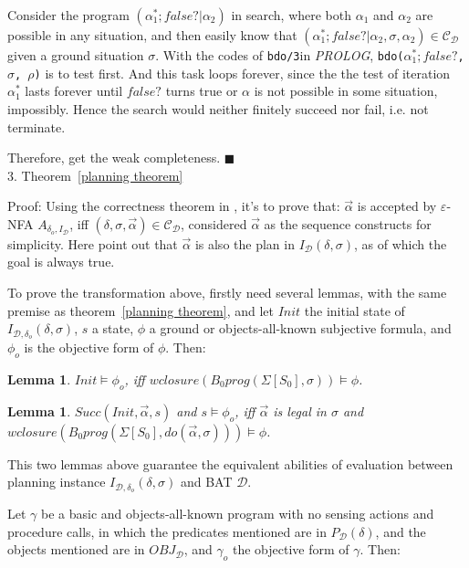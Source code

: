 \documentclass[letterpaper]{article}
\newtheorem{lemma}[theorem]{Lemma}
\begin{document}
Consider the program $(\alpha_1^*;false?|\alpha_2)$ in search, where both $\alpha_1$ and $\alpha_2$ are possible in any situation, and then easily know that $(\alpha_1^*;false?|\alpha_2, \sigma, \alpha_2)\in \mathcal{C_D}$ given a ground situation $\sigma$. With the codes of \texttt{bdo/3}in \emph{PROLOG}, \texttt{bdo($\alpha_1^*;false?$, $\sigma$, $\rho$)} is to test first. And this task loops forever, since the the test of iteration $\alpha_1^*$ lasts forever until $false?$ turns true or $\alpha$ is not possible in some situation, impossibly. Hence the search would neither finitely succeed nor fail, i.e. not terminate.

Therefore, get the weak completeness.
$\blacksquare$
\\

3. Theorem~\ref{planning theorem}

Proof: Using the correctness theorem in \cite{BFM07}, it's to prove that: $\vec{\alpha}$ is accepted by $\varepsilon$-NFA $A_{\delta_o,I_\mathcal{D}}$, iff $(\delta,\sigma,\vec{\alpha})\in\mathcal{C_D}$, considered $\vec{\alpha}$ as the sequence constructs for simplicity. Here point out that $\vec{\alpha}$ is also the plan in $I_\mathcal{D}(\delta,\sigma)$, as of which the goal is always true.

To prove the transformation above, firstly need several lemmas, with the same premise as theorem~\ref{planning theorem}, and let $Init$ the initial state of $I_{\mathcal{D},\delta_o}(\delta,\sigma)$, $s$ a state, $\phi$ a ground or objects-all-known subjective formula, and $\phi_o$ is the objective form of $\phi$. Then:

\begin{lemma}\label{init evaluation}
$Init\models\phi_o$, iff $wclosure(B_0 prog(\Sigma[S_0],\sigma))\models\phi$.
\end{lemma}

\begin{lemma}\label{prog evaluation}
$Succ(Init,\vec{\alpha},s)$ and $s\models\phi_o$, iff $\vec{\alpha}$ is legal in $\sigma$ and $wclosure(B_0 prog(\Sigma[S_0],do(\vec{\alpha},\sigma)))\models\phi$.
\end{lemma}

This two lemmas above guarantee the equivalent abilities of evaluation between planning instance $I_{\mathcal{D},\delta_o}(\delta,\sigma)$ and BAT $\mathcal{D}$.

Let $\gamma$ be a basic and objects-all-known program with no sensing actions and procedure calls, in which the predicates mentioned are in $P_\mathcal{D} (\delta)$, and the objects mentioned are in $OBJ_\mathcal{D}$, and $\gamma_o$ the objective form of $\gamma$. Then:
\end{document}
